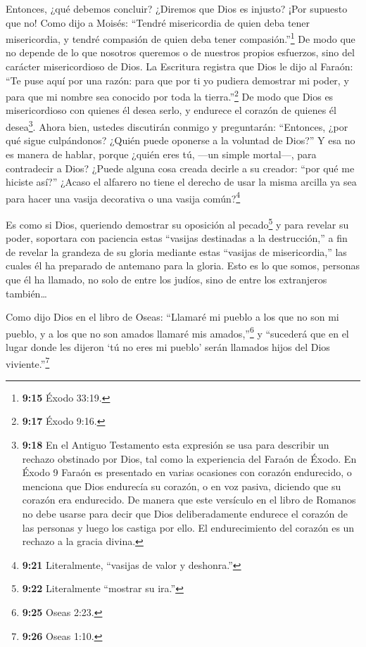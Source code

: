  Entonces, ¿qué debemos concluir? ¿Diremos que Dios es
injusto? ¡Por supuesto que no!  Como dijo a Moisés:
``Tendré misericordia de quien deba tener misericordia, y tendré
compasión de quien deba tener compasión.''\footnote{\textbf{9:15} Éxodo
  33:19.}  De modo que no depende de lo que nosotros
queremos o de nuestros propios esfuerzos, sino del carácter
misericordioso de Dios.  La Escritura registra que Dios le
dijo al Faraón: ``Te puse aquí por una razón: para que por ti yo pudiera
demostrar mi poder, y para que mi nombre sea conocido por toda la
tierra.''\footnote{\textbf{9:17} Éxodo 9:16.}  De modo que
Dios es misericordioso con quienes él desea serlo, y endurece el corazón
de quienes él desea\footnote{\textbf{9:18} En el Antiguo Testamento esta
  expresión se usa para describir un rechazo obstinado por Dios, tal
  como la experiencia del Faraón de Éxodo. En Éxodo 9 Faraón es
  presentado en varias ocasiones con corazón endurecido, o menciona que
  Dios endurecía su corazón, o en voz pasiva, diciendo que su corazón
  era endurecido. De manera que este versículo en el libro de Romanos no
  debe usarse para decir que Dios deliberadamente endurece el corazón de
  las personas y luego los castiga por ello. El endurecimiento del
  corazón es un rechazo a la gracia divina.}.  Ahora bien,
ustedes discutirán conmigo y preguntarán: ``Entonces, ¿por qué sigue
culpándonos? ¿Quién puede oponerse a la voluntad de Dios?''
 Y esa no es manera de hablar, porque ¿quién eres tú, ---un
simple mortal---, para contradecir a Dios? ¿Puede alguna cosa creada
decirle a su creador: ``por qué me hiciste así?''  ¿Acaso
el alfarero no tiene el derecho de usar la misma arcilla ya sea para
hacer una vasija decorativa o una vasija común?\footnote{\textbf{9:21}
  Literalmente, ``vasijas de valor y deshonra.''}

 Es como si Dios, queriendo demostrar su oposición al
pecado\footnote{\textbf{9:22} Literalmente ``mostrar su ira.''} y para
revelar su poder, soportara con paciencia estas ``vasijas destinadas a
la destrucción,''  a fin de revelar la grandeza de su
gloria mediante estas ``vasijas de misericordia,'' las cuales él ha
preparado de antemano para la gloria.  Esto es lo que
somos, personas que él ha llamado, no solo de entre los judíos, sino de
entre los extranjeros también\ldots{}

 Como dijo Dios en el libro de Oseas: ``Llamaré mi pueblo a
los que no son mi pueblo, y a los que no son amados llamaré mis
amados,''\footnote{\textbf{9:25} Oseas 2:23.}  y ``sucederá
que en el lugar donde les dijeron `tú no eres mi pueblo' serán llamados
hijos del Dios viviente.''\footnote{\textbf{9:26} Oseas 1:10.}


